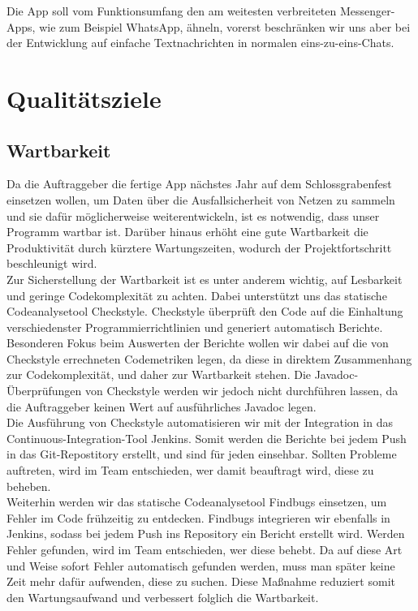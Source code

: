 \documentclass[accentcolor=tud0b,12pt,paper=a4]{tudreport}
\begin{document}
		Die App soll vom Funktionsumfang den am weitesten verbreiteten Messenger-Apps, wie zum Beispiel WhatsApp, ähneln, vorerst beschränken wir uns aber bei der Entwicklung auf einfache Textnachrichten in normalen eins-zu-eins-Chats.\\

	\chapter{Qualitätsziele}
        \section{Wartbarkeit}
    
		Da die Auftraggeber die fertige App nächstes Jahr auf dem Schlossgrabenfest einsetzen wollen, um Daten über die Ausfallsicherheit von Netzen zu sammeln und sie dafür möglicherweise weiterentwickeln, ist es notwendig, dass unser Programm wartbar ist. Darüber hinaus erhöht eine gute Wartbarkeit die Produktivität durch kürztere Wartungszeiten, wodurch der Projektfortschritt beschleunigt wird.\\

                Zur Sicherstellung der Wartbarkeit ist es unter anderem wichtig, auf Lesbarkeit und geringe Codekomplexität zu achten. Dabei unterstützt uns das statische Codeanalysetool Checkstyle. Checkstyle überprüft den Code auf die Einhaltung verschiedenster Programmierrichtlinien und generiert automatisch Berichte. Besonderen Fokus beim Auswerten der Berichte wollen wir dabei auf die von Checkstyle errechneten Codemetriken legen, da diese in direktem Zusammenhang zur Codekomplexität, und daher zur Wartbarkeit stehen. Die Javadoc-Überprüfungen von Checkstyle werden wir jedoch nicht durchführen lassen, da die Auftraggeber keinen Wert auf ausführliches Javadoc legen.\\

                Die Ausführung von Checkstyle automatisieren wir mit der Integration in das Continuous-Integration-Tool Jenkins. Somit werden die Berichte bei jedem Push in das Git-Repostitory erstellt, und sind für jeden einsehbar. Sollten Probleme auftreten, wird im Team entschieden, wer damit beauftragt wird, diese zu beheben.\\

                Weiterhin werden wir das statische Codeanalysetool Findbugs einsetzen, um Fehler im Code frühzeitig zu entdecken. Findbugs integrieren wir ebenfalls in Jenkins, sodass bei jedem Push ins Repository ein Bericht erstellt wird. Werden Fehler gefunden, wird im Team entschieden, wer diese behebt. Da auf diese Art und Weise sofort Fehler automatisch gefunden werden, muss man später keine Zeit mehr dafür aufwenden, diese zu suchen. Diese Maßnahme reduziert somit den Wartungsaufwand und verbessert folglich die Wartbarkeit.\\
\end{document}
